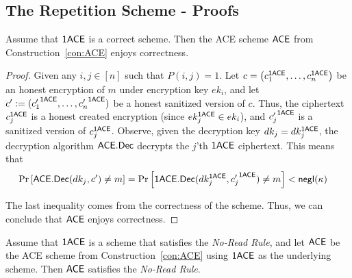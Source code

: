\documentclass{llncs}
\begin{document}
\subsection{The Repetition Scheme - Proofs}\label{app:repetitionproofs}


\begin{lem}
Assume that $\mathsf{1ACE}$ is a correct \oACE scheme.
Then the ACE scheme $\mathsf{ACE}$ from Construction~\ref{con:ACE} enjoys correctness.
\end{lem}

\begin{proof}
Given any $i,j \in [n]$ such that $P(i,j) = 1$.
Let $c = \left( c_1^{\mathsf{1ACE}}, \dots, c_n^{\mathsf{1ACE}}  \right)$ be an honest encryption of $m$ under encryption key $ek_i$, and let $c' := ({c'_1}^{\mathsf{1ACE}},\dots,{c'_n}^{\mathsf{1ACE}})$ be a honest sanitized version of $c$.
Thus, the ciphertext $c_j^{\mathsf{1ACE}}$ is a honest created \oACE encryption (since $ek_j^{\mathsf{1ACE}} \in ek_i$), and ${c'_j}^{\mathsf{1ACE}}$ is a sanitized version of $c_j^{\mathsf{1ACE}}$. 
Observe, given the decryption key $dk_j = dk_j^{\mathsf{1ACE}}$, the decryption algorithm $\mathsf{ACE}.\mathsf{Dec}$ decrypts the $j$'th $\mathsf{1ACE}$ ciphertext.
This means that
\begin{align*}
	\Pr \left[ \mathsf{ACE}.\mathsf{Dec}(dk_j,c') \neq m \right] &= \Pr \left[ \mathsf{1ACE}.\mathsf{Dec}(dk_j^{\mathsf{1ACE}},{c'_j}^{\mathsf{1ACE}}) \neq m \right]
		< \mathsf{negl}(\kappa)
\end{align*}

The last inequality comes from the correctness of the \oACE scheme.
Thus, we can conclude that $\mathsf{ACE}$ enjoys correctness.
\end{proof}



\begin{thm} \label{thm:no-read}
Assume that $\mathsf{1ACE}$ is a \oACE scheme that satisfies the \emph{No-Read Rule}, and let $\mathsf{ACE}$ be the ACE scheme from Construction~\ref{con:ACE} using $\mathsf{1ACE}$ as the underlying \oACE scheme. Then $\mathsf{ACE}$ satisfies the \emph{No-Read Rule}.
\end{thm}
\end{document}
